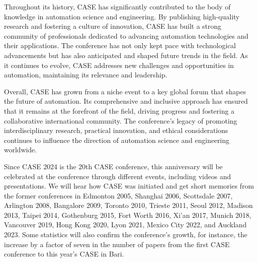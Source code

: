 \documentclass[
	openany, %
	parskip=full, %
	12pt, %
	a4paper, %
]{conferencebooklet} %
\begin{document}
Throughout its history, CASE has significantly contributed to the body of knowledge in automation science and engineering. By publishing high-quality research and fostering a culture of innovation, CASE has built a strong community of professionals dedicated to advancing automation technologies and their applications. The conference has not only kept pace with technological advancements but has also anticipated and shaped future trends in the field. As it continues to evolve, CASE addresses new challenges and opportunities in automation, maintaining its relevance and leadership.

Overall, CASE has grown from a niche event to a key global forum that shapes the future of automation. Its comprehensive and inclusive approach has ensured that it remains at the forefront of the field, driving progress and fostering a collaborative international community. The conference’s legacy of promoting interdisciplinary research, practical innovation, and ethical considerations continues to influence the direction of automation science and engineering worldwide.

Since CASE 2024 is the 20th CASE conference, this anniversary will be celebrated at the conference through different events, including videos and presentations. We will hear how CASE was initiated and get short memories from the former conferences in Edmonton 2005, Shanghai 2006, Scottsdale 2007, Arlington 2008, Bangalore 2009, Toronto 2010, Trieste 2011, Seoul 2012, Madison 2013, Taipei 2014, Gothenburg 2015, Fort Worth 2016, Xi’an 2017, Munich 2018, Vancouver 2019, Hong Kong 2020, Lyon 2021, Mexico City 2022, and Auckland 2023. Some statistics will also confirm the conference's growth, for instance, the increase by a factor of seven in the number of papers from the first CASE conference to this year’s CASE in Bari.


\newpage
\end{document}
